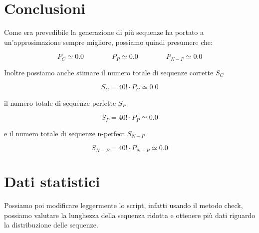 \documentclass[a4paper]{article}
\begin{document}
\newpage

\section{Conclusioni}

Come era prevedibile la generazione di più sequenze ha portato a un'approsimazione sempre migliore, possiamo quindi presumere che:

\begin{equation*}
    P_C \simeq 0.0
    \qquad
    \qquad
    P_P \simeq 0.0
    \qquad
    \qquad
    P_{N-P} \simeq 0.0
\end{equation*}

\vspace{0.5cm}
\noindent
Inoltre possiamo anche stimare il numero totale di sequenze corrette $S_C$

\begin{equation*}
    S_C  = 40! \cdot P_C \simeq 0.0
\end{equation*}

\vspace{0.5cm}
\noindent
il numero totale di sequenze perfette $S_P$

\begin{equation*}
    S_P  = 40! \cdot P_P \simeq 0.0
\end{equation*}

\vspace{0.5cm}
\noindent
e il numero totale di sequenze n-perfect $S_{N-P}$

\begin{equation*}
    S_{N-P}  = 40! \cdot P_{N-P} \simeq 0.0
\end{equation*}

\newpage

\section{Dati statistici}
Possiamo poi modificare leggermente lo script, infatti usando il metodo check, possiamo valutare la lunghezza della sequenza ridotta e ottenere più dati riguardo la distribuzione delle sequenze.
\end{document}
